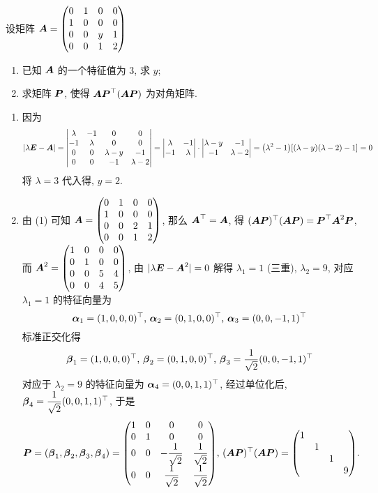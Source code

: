 \begin{example}
    设矩阵 $\vb*{A}=\mqty(0&1&0&0\\1&0&0&0\\0&0&y&1\\0&0&1&2)$
    \begin{enumerate}[label=(\arabic{*})]
        \item 已知 $\vb*{A}$ 的一个特征值为 3, 求 $y$;
        \item 求矩阵 $\vb*{P}$, 使得 $\vb*{AP}^{\top}(\vb*{AP})$ 为对角矩阵.
    \end{enumerate}
\end{example}
\begin{solution}
    \begin{enumerate}[label=(\arabic{*})]
        \item 因为 $$|\lambda\vb*{E}-\vb*{A}|=\mqty|\lambda&-1&0&0\\-1&\lambda&0&0\\0&0&\lambda-y&-1\\0&0&-1&\lambda-2|=\mqty|\lambda&-1\\-1&\lambda|\cdot\mqty|\lambda-y&-1\\-1&\lambda-2|=\qty(\lambda^2-1)[(\lambda-y)(\lambda-2)-1]=0$$
              将 $\lambda=3$ 代入得, $y=2$.
        \item 由 (1) 可知 $\vb*{A}=\mqty(0&1&0&0\\1&0&0&0\\0&0&2&1\\0&0&1&2)$, 那么 $\vb*{A}^\top=\vb*{A}$, 得 $(\vb*{AP})^\top(\vb*{AP})=\vb*{P}^\top\vb*{A}^2\vb*{P}$,
              而 $\vb*{A}^2=\mqty(1&0&0&0\\0&1&0&0\\0&0&5&4\\0&0&4&5)$, 由 $|\lambda\vb*{E}-\vb*{A}^2|=0$ 解得 $\lambda_1=1$ (三重), $\lambda_2=9$, 对应 $\lambda_1=1$ 的特征向量为
              $$\vb*{\alpha}_1=(1,0,0,0)^\top\text{, }\vb*{\alpha}_2=(0,1,0,0)^\top\text{, }\vb*{\alpha}_3=(0,0,-1,1)^\top$$
              标准正交化得 $$\vb*{\beta}_1=(1,0,0,0)^\top\text{, }\vb*{\beta}_2=(0,1,0,0)^\top\text{, }\vb*{\beta}_3=\dfrac{1}{\sqrt{2}}(0,0,-1,1)^\top$$
              对应于 $\lambda_2=9$ 的特征向量为 $\vb*{\alpha}_4=(0,0,1,1)^\top$, 经过单位化后, $\vb*{\beta}_4=\dfrac{1}{\sqrt{2}}(0,0,1,1)^\top$, 于是
              $$\vb*{P}=(\vb*{\beta}_1,\vb*{\beta}_2,\vb*{\beta}_3,\vb*{\beta}_4)=\mqty(1&0&0&0\\0&1&0&0\\0&0&-\dfrac{1}{\sqrt{2}}&\dfrac{1}{\sqrt{2}}\\[6pt]0&0&\dfrac{1}{\sqrt{2}}&\dfrac{1}{\sqrt{2}})\text{, }(\vb*{AP})^\top(\vb*{AP})=\mqty(\dmat{1,1,1,9}).$$
    \end{enumerate}
\end{solution}

